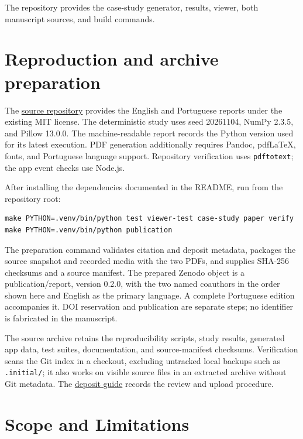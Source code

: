 \documentclass[
  11pt,
  a4paper,
]{article}
\begin{document}
The repository provides the case-study generator, results, viewer, both
manuscript sources, and build commands.

\hypertarget{reproduction-and-archive-preparation}{%
\section{Reproduction and archive
preparation}\label{reproduction-and-archive-preparation}}

The \href{https://github.com/cecil-ia-labs/datamatrix-payload}{source
repository} provides the English and Portuguese reports under the
existing MIT license. The deterministic study uses seed 20261104, NumPy
2.3.5, and Pillow 13.0.0. The machine-readable report records the Python
version used for its latest execution. PDF generation additionally
requires Pandoc, pdfLaTeX, fonts, and Portuguese language support.
Repository verification uses \texttt{pdftotext}; the app event checks
use Node.js.

After installing the dependencies documented in the README, run from the
repository root:

\begin{verbatim}
make PYTHON=.venv/bin/python test viewer-test case-study paper verify
make PYTHON=.venv/bin/python publication
\end{verbatim}

The preparation command validates citation and deposit metadata,
packages the source snapshot and recorded media with the two PDFs, and
supplies SHA-256 checksums and a source manifest. The prepared Zenodo
object is a publication/report, version 0.2.0, with the two named
coauthors in the order shown here and English as the primary language. A
complete Portuguese edition accompanies it. DOI reservation and
publication are separate steps; no identifier is fabricated in the
manuscript.

The source archive retains the reproducibility scripts, study results,
generated app data, test suites, documentation, and source-manifest
checksums. Verification scans the Git index in a checkout, excluding
untracked local backups such as \texttt{.initial/}; it also works on
visible source files in an extracted archive without Git metadata. The
\href{https://github.com/cecil-ia-labs/datamatrix-payload/blob/main/docs/publication.md}{deposit
guide} records the review and upload procedure.

\hypertarget{scope-and-limitations}{%
\section{Scope and Limitations}\label{scope-and-limitations}}
\end{document}
